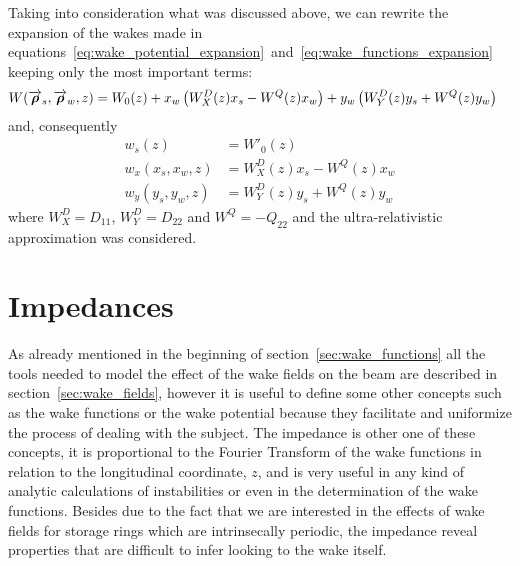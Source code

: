     Taking into consideration what was discussed above, we can rewrite the expansion of the wakes made in equations~\eqref{eq:wake_potential_expansion}~and~\eqref{eq:wake_functions_expansion} keeping only the most important terms:
    \begin{align}\label{eq:important_wake_potential}
  	  	W(\overrightarrow{\boldsymbol{\rho}}_s, \overrightarrow{\boldsymbol{\rho}}_w, z) &=
	  		W_0(z) +
			x_w\left(W^D_X(z)x_s - W^Q(z)x_w\right) +
			y_w\left(W^D_Y(z)y_s + W^Q(z)y_w\right)
    \end{align}
    and, consequently
    \begin{align}\label{eq:important_wakes}\nonumber
  		w_s(z) &= W'_0(z) \\
		w_x(x_s, x_w, z) &= W^D_X(z)x_s - W^Q(z)x_w \\\nonumber
		w_y(y_s, y_w, z) &= W^D_Y(z)y_s + W^Q(z)y_w
    \end{align}
    where $W^D_X = D_{11}$, $W^D_Y = D_{22}$ and $W^Q = -Q_{22}$ and the ultra-relativistic approximation was considered.

\section{Impedances}\label{sec:impedances}

    As already mentioned in the beginning of section~\ref{sec:wake_functions} all the tools needed to model the effect of the wake fields on the beam are described in section~\ref{sec:wake_fields}, however it is useful to define some other concepts such as the wake functions or the wake potential because they facilitate and uniformize the process of dealing with the subject. The impedance is other one of these concepts, it is proportional to the Fourier Transform of the wake functions in relation to the longitudinal coordinate, $z$, and is very useful in any kind of analytic calculations of instabilities or even in the determination of the wake functions. Besides due to the fact that we are interested in the effects of wake fields for storage rings which are intrinsecally periodic, the impedance reveal properties that are difficult to infer looking to the wake itself.

